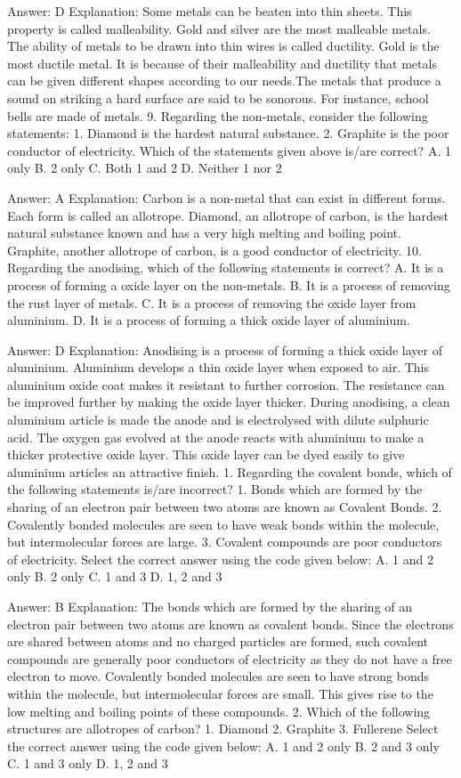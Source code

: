 Answer: D
Explanation: Some metals can be beaten into thin sheets. This property is called malleability. Gold and silver are the most malleable metals. The ability of metals to be drawn into thin wires is called ductility. Gold is the most ductile metal. It is because of their malleability and ductility that metals can be given different shapes according to our needs.The metals that produce a sound on striking a hard surface are said to be sonorous. For instance, school bells are made of metals. 9. Regarding the non-metals, consider the following statements: 1. Diamond is the hardest natural substance. 2. Graphite is the poor conductor of electricity. Which of the statements given above is/are correct? A. 1 only B. 2 only C. Both 1 and 2 D. Neither 1 nor 2 

Answer: A
Explanation: Carbon is a non-metal that can exist in different forms. Each form is called an allotrope. Diamond, an allotrope of carbon, is the hardest natural substance known and has a very high melting and boiling point. Graphite, another allotrope of carbon, is a good conductor of electricity. 10. Regarding the anodising, which of the following statements is correct? A. It is a process of forming a oxide layer on the non-metals. B. It is a process of removing the rust layer of metals. C. It is a process of removing the oxide layer from aluminium. D. It is a process of forming a thick oxide layer of aluminium. 

Answer: D
Explanation: Anodising is a process of forming a thick oxide layer of aluminium. Aluminium develops a thin oxide layer when exposed to air. This aluminium oxide coat makes it resistant to further corrosion. The resistance can be improved further by making the oxide layer thicker. During anodising, a clean aluminium article is made the anode and is electrolysed with dilute sulphuric acid. The oxygen gas evolved at the anode reacts with aluminium to make a thicker protective oxide layer. This oxide layer can be dyed easily to give aluminium articles an attractive finish. 1. Regarding the covalent bonds, which of the following statements is/are incorrect? 1. Bonds which are formed by the sharing of an electron pair between two atoms are known as Covalent Bonds. 2. Covalently bonded molecules are seen to have weak bonds within the molecule, but intermolecular forces are large. 3. Covalent compounds are poor conductors of electricity. Select the correct answer using the code given below: A. 1 and 2 only B. 2 only C. 1 and 3 D. 1, 2 and 3 

Answer: B
Explanation: The bonds which are formed by the sharing of an electron pair between two atoms are known as covalent bonds. Since the electrons are shared between atoms and no charged particles are formed, such covalent compounds are generally poor conductors of electricity as they do not have a free electron to move. Covalently bonded molecules are seen to have strong bonds within the molecule, but intermolecular forces are small. This gives rise to the low melting and boiling points of these compounds. 2. Which of the following structures are allotropes of carbon? 1. Diamond 2. Graphite 3. Fullerene Select the correct answer using the code given below: A. 1 and 2 only B. 2 and 3 only C. 1 and 3 only D. 1, 2 and 3 

